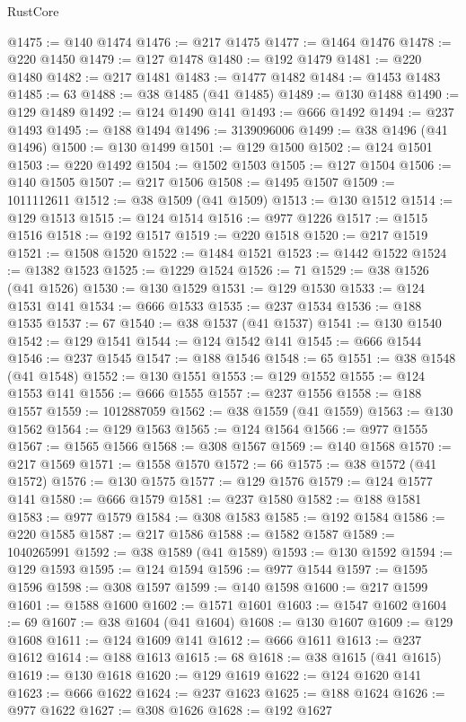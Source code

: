 \begin{lexlean}{RustCore}
\begin{coremodule}
@1475 := @140 @1474
@1476 := @217 @1475
@1477 := @1464 @1476
@1478 := @220 @1450
@1479 := @127 @1478
@1480 := @192 @1479
@1481 := @220 @1480
@1482 := @217 @1481
@1483 := @1477 @1482
@1484 := @1453 @1483
@1485 := 63
@1488 := @38 @1485 (@41 @1485)
@1489 := @130 @1488
@1490 := @129 @1489
@1492 := @124 @1490 @141
@1493 := @666 @1492
@1494 := @237 @1493
@1495 := @188 @1494
@1496 := 3139096006
@1499 := @38 @1496 (@41 @1496)
@1500 := @130 @1499
@1501 := @129 @1500
@1502 := @124 @1501
@1503 := @220 @1492
@1504 := @1502 @1503
@1505 := @127 @1504
@1506 := @140 @1505
@1507 := @217 @1506
@1508 := @1495 @1507
@1509 := 1011112611
@1512 := @38 @1509 (@41 @1509)
@1513 := @130 @1512
@1514 := @129 @1513
@1515 := @124 @1514
@1516 := @977 @1226
@1517 := @1515 @1516
@1518 := @192 @1517
@1519 := @220 @1518
@1520 := @217 @1519
@1521 := @1508 @1520
@1522 := @1484 @1521
@1523 := @1442 @1522
@1524 := @1382 @1523
@1525 := @1229 @1524
@1526 := 71
@1529 := @38 @1526 (@41 @1526)
@1530 := @130 @1529
@1531 := @129 @1530
@1533 := @124 @1531 @141
@1534 := @666 @1533
@1535 := @237 @1534
@1536 := @188 @1535
@1537 := 67
@1540 := @38 @1537 (@41 @1537)
@1541 := @130 @1540
@1542 := @129 @1541
@1544 := @124 @1542 @141
@1545 := @666 @1544
@1546 := @237 @1545
@1547 := @188 @1546
@1548 := 65
@1551 := @38 @1548 (@41 @1548)
@1552 := @130 @1551
@1553 := @129 @1552
@1555 := @124 @1553 @141
@1556 := @666 @1555
@1557 := @237 @1556
@1558 := @188 @1557
@1559 := 1012887059
@1562 := @38 @1559 (@41 @1559)
@1563 := @130 @1562
@1564 := @129 @1563
@1565 := @124 @1564
@1566 := @977 @1555
@1567 := @1565 @1566
@1568 := @308 @1567
@1569 := @140 @1568
@1570 := @217 @1569
@1571 := @1558 @1570
@1572 := 66
@1575 := @38 @1572 (@41 @1572)
@1576 := @130 @1575
@1577 := @129 @1576
@1579 := @124 @1577 @141
@1580 := @666 @1579
@1581 := @237 @1580
@1582 := @188 @1581
@1583 := @977 @1579
@1584 := @308 @1583
@1585 := @192 @1584
@1586 := @220 @1585
@1587 := @217 @1586
@1588 := @1582 @1587
@1589 := 1040265991
@1592 := @38 @1589 (@41 @1589)
@1593 := @130 @1592
@1594 := @129 @1593
@1595 := @124 @1594
@1596 := @977 @1544
@1597 := @1595 @1596
@1598 := @308 @1597
@1599 := @140 @1598
@1600 := @217 @1599
@1601 := @1588 @1600
@1602 := @1571 @1601
@1603 := @1547 @1602
@1604 := 69
@1607 := @38 @1604 (@41 @1604)
@1608 := @130 @1607
@1609 := @129 @1608
@1611 := @124 @1609 @141
@1612 := @666 @1611
@1613 := @237 @1612
@1614 := @188 @1613
@1615 := 68
@1618 := @38 @1615 (@41 @1615)
@1619 := @130 @1618
@1620 := @129 @1619
@1622 := @124 @1620 @141
@1623 := @666 @1622
@1624 := @237 @1623
@1625 := @188 @1624
@1626 := @977 @1622
@1627 := @308 @1626
@1628 := @192 @1627

\end{coremodule}
\end{lexlean}
